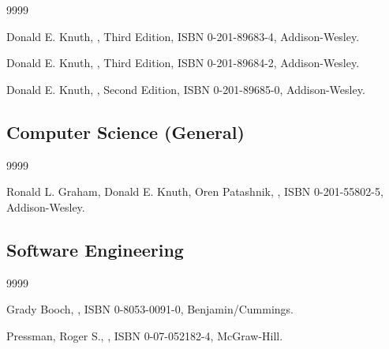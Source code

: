 \begin{thecustombibliography}{9999}

Donald E. Knuth,
,
Third Edition, ISBN 0-201-89683-4, Addison-Wesley.

Donald E. Knuth,
,
Third Edition, 
ISBN 0-201-89684-2, Addison-Wesley.

Donald E. Knuth,
,
Second Edition,
ISBN 0-201-89685-0, Addison-Wesley.

\end{thecustombibliography}

\subsection*{Computer Science (General)}

\begin{thecustombibliography}{9999}

Ronald L. Graham,
Donald E. Knuth,
Oren Patashnik,
,
ISBN 0-201-55802-5, Addison-Wesley.

\end{thecustombibliography}


\subsection*{Software Engineering}

\begin{thecustombibliography}{9999}

Grady Booch, 
,
ISBN 0-8053-0091-0, Benjamin/Cummings.

Pressman, Roger S., 
,
ISBN 0-07-052182-4, McGraw-Hill.

\end{thecustombibliography}



